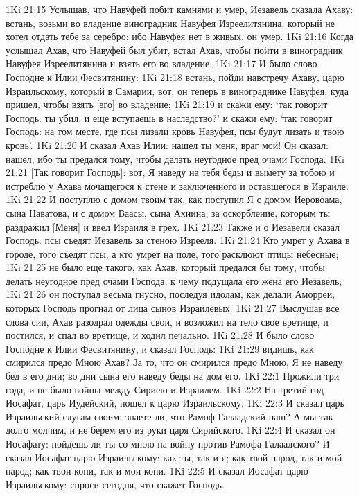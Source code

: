 1Ki 21:15  Услышав, что Навуфей побит камнями и умер, Иезавель сказала Ахаву: встань, возьми во владение виноградник Навуфея Изреелитянина, который не хотел отдать тебе за серебро; ибо Навуфея нет в живых, он умер.
1Ki 21:16  Когда услышал Ахав, что Навуфей был убит, встал Ахав, чтобы пойти в виноградник Навуфея Изреелитянина и взять его во владение.
1Ki 21:17  И было слово Господне к Илии Фесвитянину:
1Ki 21:18  встань, пойди навстречу Ахаву, царю Израильскому, который в Самарии, вот, он теперь в винограднике Навуфея, куда пришел, чтобы взять [его] во владение;
1Ki 21:19  и скажи ему: `так говорит Господь: ты убил, и еще вступаешь в наследство?' и скажи ему: `так говорит Господь: на том месте, где псы лизали кровь Навуфея, псы будут лизать и твою кровь'.
1Ki 21:20  И сказал Ахав Илии: нашел ты меня, враг мой! Он сказал: нашел, ибо ты предался тому, чтобы делать неугодное пред очами Господа.
1Ki 21:21  [Так говорит Господь]: вот, Я наведу на тебя беды и вымету за тобою и истреблю у Ахава мочащегося к стене и заключенного и оставшегося в Израиле.
1Ki 21:22  И поступлю с домом твоим так, как поступил Я с домом Иеровоама, сына Наватова, и с домом Ваасы, сына Ахиина, за оскорбление, которым ты раздражил [Меня] и ввел Израиля в грех.
1Ki 21:23  Также и о Иезавели сказал Господь: псы съедят Иезавель за стеною Изрееля.
1Ki 21:24  Кто умрет у Ахава в городе, того съедят псы, а кто умрет на поле, того расклюют птицы небесные;
1Ki 21:25  не было еще такого, как Ахав, который предался бы тому, чтобы делать неугодное пред очами Господа, к чему подущала его жена его Иезавель;
1Ki 21:26  он поступал весьма гнусно, последуя идолам, как делали Аморреи, которых Господь прогнал от лица сынов Израилевых.
1Ki 21:27  Выслушав все слова сии, Ахав разодрал одежды свои, и возложил на тело свое вретище, и постился, и спал во вретище, и ходил печально.
1Ki 21:28  И было слово Господне к Илии Фесвитянину, и сказал Господь:
1Ki 21:29  видишь, как смирился предо Мною Ахав? За то, что он смирился предо Мною, Я не наведу бед в его дни; во дни сына его наведу беды на дом его.
1Ki 22:1  Прожили три года, и не было войны между Сириею и Израилем.
1Ki 22:2  На третий год Иосафат, царь Иудейский, пошел к царю Израильскому.
1Ki 22:3  И сказал царь Израильский слугам своим: знаете ли, что Рамоф Галаадский наш? А мы так долго молчим, и не берем его из руки царя Сирийского.
1Ki 22:4  И сказал он Иосафату: пойдешь ли ты со мною на войну против Рамофа Галаадского? И сказал Иосафат царю Израильскому: как ты, так и я; как твой народ, так и мой народ; как твои кони, так и мои кони.
1Ki 22:5  И сказал Иосафат царю Израильскому: спроси сегодня, что скажет Господь.
